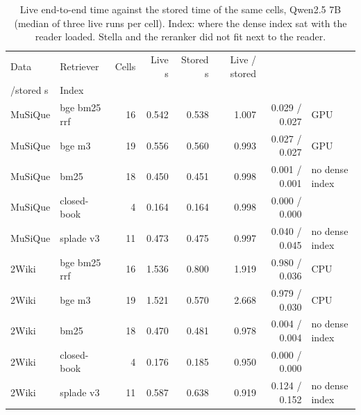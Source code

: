 \begin{table}[t]
\centering\small
\setlength{\tabcolsep}{4pt}
\caption{Live end-to-end time against the stored time of the same cells, Qwen2.5 7B (median of three live runs per cell). Index: where the dense index sat with the reader loaded. Stella and the reranker did not fit next to the reader.}
\label{tab:robust_latency}
\begin{tabular*}{\linewidth}{@{\extracolsep{\fill}}llrrrrrl}
\toprule
Data & Retriever & Cells & Live s & Stored s & Live / stored & \begin{tabular}[b]{@{}r@{}}Retrieval live \\ /stored s\end{tabular} & Index \\
\midrule
MuSiQue & bge bm25 rrf & 16 & 0.542 & 0.538 & 1.007 & 0.029 / 0.027 & GPU \\
MuSiQue & bge m3 & 19 & 0.556 & 0.560 & 0.993 & 0.027 / 0.027 & GPU \\
MuSiQue & bm25 & 18 & 0.450 & 0.451 & 0.998 & 0.001 / 0.001 & no dense index \\
MuSiQue & closed-book & 4 & 0.164 & 0.164 & 0.998 & 0.000 / 0.000 &  \\
MuSiQue & splade v3 & 11 & 0.473 & 0.475 & 0.997 & 0.040 / 0.045 & no dense index \\
2Wiki & bge bm25 rrf & 16 & 1.536 & 0.800 & 1.919 & 0.980 / 0.036 & CPU \\
2Wiki & bge m3 & 19 & 1.521 & 0.570 & 2.668 & 0.979 / 0.030 & CPU \\
2Wiki & bm25 & 18 & 0.470 & 0.481 & 0.978 & 0.004 / 0.004 & no dense index \\
2Wiki & closed-book & 4 & 0.176 & 0.185 & 0.950 & 0.000 / 0.000 &  \\
2Wiki & splade v3 & 11 & 0.587 & 0.638 & 0.919 & 0.124 / 0.152 & no dense index \\
\bottomrule
\end{tabular*}
\end{table}
